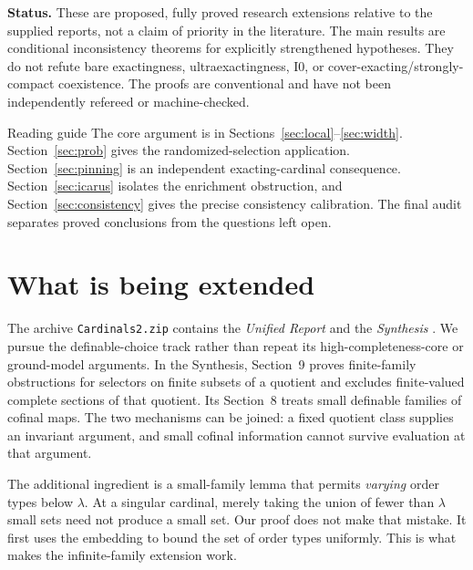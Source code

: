 \documentclass[11pt,letterpaper]{article}
\theoremstyle{definition}
\numberwithin{equation}{section}
\newcommand{\Izero}{\mathrm{I0}}
\begin{document}
\textbf{Status.} These are proposed, fully proved research extensions relative to the supplied reports, not a claim of priority in the literature. The main results are conditional inconsistency theorems for explicitly strengthened hypotheses. They do not refute bare exactingness, ultraexactingness, $\Izero$, or cover-exacting/strongly-compact coexistence. The proofs are conventional and have not been independently refereed or machine-checked.

\newpage
\tableofcontents
\vspace{15pt}
\begin{assessment}{Reading guide}
The core argument is in Sections~\ref{sec:local}--\ref{sec:width}. Section~\ref{sec:prob} gives the randomized-selection application. Section~\ref{sec:pinning} is an independent exacting-cardinal consequence. Section~\ref{sec:icarus} isolates the enrichment obstruction, and Section~\ref{sec:consistency} gives the precise consistency calibration. The final audit separates proved conclusions from the questions left open.
\end{assessment}

\newpage
\section{What is being extended}\label{sec:baseline}

The archive \nolinkurl{Cardinals2.zip} contains the \emph{Unified Report} and the \emph{Synthesis} \cite{plan,synthesis}. We pursue the definable-choice track rather than repeat its high-completeness-core or ground-model arguments. In the Synthesis, Section~9 proves finite-family obstructions for selectors on finite subsets of a quotient and excludes finite-valued complete sections of that quotient. Its Section~8 treats small definable families of cofinal maps. The two mechanisms can be joined: a fixed quotient class supplies an invariant argument, and small cofinal information cannot survive evaluation at that argument.

The additional ingredient is a small-family lemma that permits \emph{varying} order types below $\lambda$. At a singular cardinal, merely taking the union of fewer than $\lambda$ small sets need not produce a small set. Our proof does not make that mistake. It first uses the embedding to bound the set of order types uniformly. This is what makes the infinite-family extension work.
\end{document}
